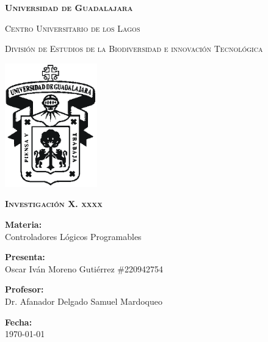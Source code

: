 \documentclass[12pt]{report}
\begin{document}
\setlength{\hoffset}{27 pt} %
\begin{titlepage}
{\centering
{\scshape\bfseries\fontsize{29.16}{34.992}\selectfont Universidad de Guadalajara \par}
\vspace{0.5cm}
{\scshape\Large Centro Universitario de los Lagos \par}
\vspace{1cm}
{\scshape\Large División de Estudios de la Biodiversidad e innovación Tecnológica \par}
\vspace{1cm}
{\graphicspath{{imagenes/Portada}} %
\includegraphics[width=0.3\textwidth]{image.png}\par}
\vspace{1cm}
{\scshape\large\bfseries Investigación X. xxxx \par}
\vspace{1.5cm}
{\large \textbf{Materia:} \\Controladores Lógicos Programables\par}
\vfill
{\large \textbf{Presenta:} \\Oscar Iván Moreno Gutiérrez \#220942754\par}
\vfill
{\large \textbf{Profesor:} \\Dr. Afanador Delgado Samuel Mardoqueo \par}
\vfill
\vfill
\begin{flushright}
  {\normalsize \textbf {Fecha:} \\ \today}
\end{flushright}
\vfill}
{\large  \par}
\end{titlepage}

\tableofcontents
\newpage
\end{document}
